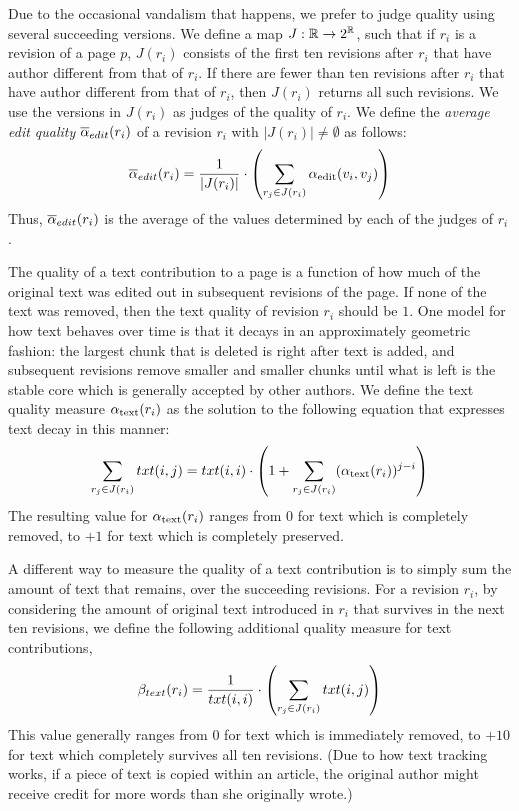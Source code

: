 Due to the occasional vandalism that happens, we prefer to
judge quality using several succeeding versions.
We define a map $J : \mathbb{R} \to 2^{\mathbb{R}}$,
such that if $r_i$ is a revision of a page $p$, 
$J(r_i)$ consists of the first ten revisions after $r_i$ that have
author different from that of $r_i$.
If there are fewer than ten revisions after $r_i$ that have author
different from that of $r_i$, then $J(r_i)$ returns all such
revisions. 
We use the versions in $J(r_i)$ as judges of the quality of $r_i$.
We define the {\em average edit quality} ${\overline{\alpha}}_{edit}(r_i)$
of a revision $r_i$ with $|J(r_i)| \neq \emptyset$ as follows:
%
\[
{\overline{\alpha}}_{edit}(r_i) = 
\frac{1}{|J(r_i)|} \cdot \left( \sum_{r_j \in J(r_i)} 
  \alpha_\text{edit}(v_i, v_j) \right)
\]
%
Thus, ${\overline{\alpha}}_{edit}(r_i)$ is the average of the \editquality values
determined by each of the judges of $r_i$.

The quality of a text contribution to a page is a function of
how much of the original text was edited out in subsequent
revisions of the page.
If none of the text was removed, then the text quality of revision
$r_i$ should be $1$.
One model for how text behaves over time is that it decays in
an approximately geometric fashion:
the largest chunk that is deleted is right after text is added,
and subsequent revisions remove smaller and smaller chunks
until what is left is the stable core which is generally
accepted by other authors.
We define the text quality measure 
$\alpha_\text{text}(r_i)$ as the solution to the following equation that
expresses text decay in this manner:
%
\[
\sum_{r_j \in J(r_i)} txt(i,j) = 
txt(i,i) \cdot \left( 1 +\sum_{r_j \in J(r_i)} (\alpha_\text{text}(r_i))^{j-i} \right)
\]
%
The resulting value for $\alpha_\text{text}(r_i)$ ranges from $0$
for text which is completely removed, to $+1$ for text which
is completely preserved.

A different way to measure the quality of a text contribution
is to simply sum the amount of text that remains, over the
succeeding revisions.
For a revision $r_i$, by considering the amount of original text 
introduced in $r_i$ that survives in the next ten revisions, we 
define the following additional quality measure for text 
contributions,
%
\[
\beta_{text}(r_i) = \frac{1}{txt(i,i)} \cdot
\left( \sum_{r_j \in J(r_i)} txt(i,j) \right)
\]
%
This value generally ranges from $0$ for text which is immediately removed,
to $+10$ for text which completely survives all ten revisions.
(Due to how text tracking works, if a piece of text is copied within
an article, the original author might receive credit for more
words than she originally wrote.)

